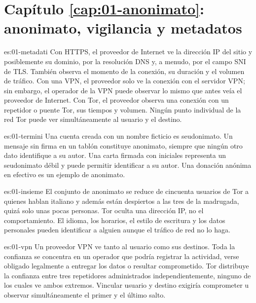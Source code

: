 \section*{Capítulo \ref{cap:01-anonimato}: anonimato, vigilancia y metadatos}

\begin{soluzione}{es:01-metadati}
Con HTTPS, el proveedor de Internet ve la dirección IP del sitio y posiblemente su dominio, por la resolución DNS y, a menudo, por el campo SNI de TLS. También observa el momento de la conexión, su duración y el volumen de tráfico. Con una VPN, el proveedor solo ve la conexión con el servidor VPN; sin embargo, el operador de la VPN puede observar lo mismo que antes veía el proveedor de Internet. Con Tor, el proveedor observa una conexión con un repetidor o puente Tor, sus tiempos y volumen. Ningún punto individual de la red Tor puede ver simultáneamente al usuario y el destino.
\end{soluzione}

\begin{soluzione}{es:01-termini}
Una cuenta creada con un nombre ficticio es seudonimato. Un mensaje sin firma en un tablón constituye anonimato, siempre que ningún otro dato identifique a su autor. Una carta firmada con iniciales representa un seudonimato débil y puede permitir identificar a su autor. Una donación anónima en efectivo es un ejemplo de anonimato.
\end{soluzione}

\begin{soluzione}{es:01-insieme}
El conjunto de anonimato se reduce de cincuenta usuarios de Tor a quienes hablan italiano y además están despiertos a las tres de la madrugada, quizá solo unas pocas personas. Tor oculta una dirección IP, no el comportamiento. El idioma, los horarios, el estilo de escritura y los datos personales pueden identificar a alguien aunque el tráfico de red no lo haga.
\end{soluzione}

\begin{soluzione}{es:01-vpn}
Un proveedor VPN ve tanto al usuario como sus destinos. Toda la confianza se concentra en un operador que podría registrar la actividad, verse obligado legalmente a entregar los datos o resultar comprometido. Tor distribuye la confianza entre tres repetidores administrados independientemente, ninguno de los cuales ve ambos extremos. Vincular usuario y destino exigiría comprometer u observar simultáneamente el primer y el último salto.
\end{soluzione}

